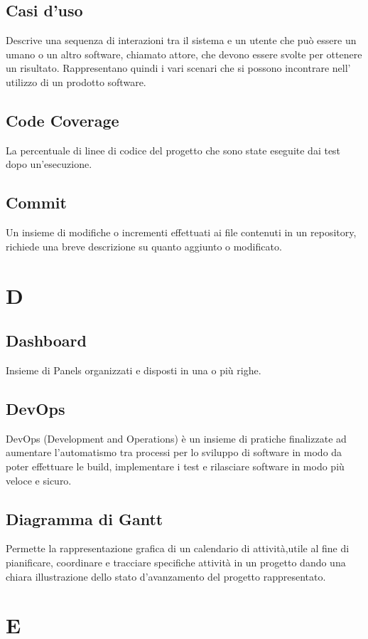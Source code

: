     \subsection*{Casi d’uso}
Descrive una sequenza di interazioni tra il sistema e un utente che può essere un umano o un altro software, chiamato attore, che devono essere svolte per ottenere un risultato. Rappresentano quindi i vari scenari che si possono incontrare nell’ utilizzo di un prodotto software.
    \subsection*{Code Coverage}
La percentuale di linee di codice del progetto che sono state eseguite dai test dopo un’esecuzione.
    \subsection*{Commit}
Un insieme di modifiche o incrementi effettuati ai file contenuti in un repository, richiede una breve descrizione su quanto aggiunto o modificato.
\newpage

\section{D}
    \subsection*{Dashboard}
Insieme di Panels organizzati e disposti in una o più righe.
    \subsection*{DevOps}
DevOps (Development and Operations) è un insieme di pratiche finalizzate ad aumentare l’automatismo tra processi per lo sviluppo di software in modo da poter effettuare le build, implementare i test e rilasciare software in modo più veloce e sicuro.
    \subsection*{Diagramma di Gantt}
Permette la rappresentazione grafica di un calendario di attività,utile al fine di pianificare, coordinare e tracciare specifiche attività in un progetto dando una chiara illustrazione dello stato d’avanzamento del progetto rappresentato.
\newpage

\section{E}
